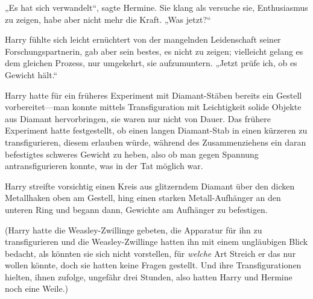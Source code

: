 „Es hat sich verwandelt“, sagte Hermine. Sie klang als versuche sie, Enthusiasmus zu zeigen, habe aber nicht mehr die Kraft. „Was jetzt?“

Harry fühlte sich leicht ernüchtert von der mangelnden Leidenschaft seiner Forschungspartnerin, gab aber sein bestes, es nicht zu zeigen; vielleicht gelang es dem gleichen Prozess, nur umgekehrt, sie aufzumuntern. „Jetzt prüfe ich, ob es Gewicht hält.“

Harry hatte für ein früheres Experiment mit Diamant-Stäben bereits ein Gestell vorbereitet—man konnte mittels Transfiguration mit Leichtigkeit solide Objekte aus Diamant hervorbringen, sie waren nur nicht von Dauer. Das frühere Experiment hatte festgestellt, ob einen langen Diamant-Stab in einen kürzeren zu transfigurieren, diesem erlauben würde, während des Zusammenziehens ein daran befestigtes schweres Gewicht zu heben, also ob man gegen Spannung antransfigurieren konnte, was in der Tat möglich war.

Harry streifte vorsichtig einen Kreis aus glitzerndem Diamant über den dicken Metallhaken oben am Gestell, hing einen starken Metall-Aufhänger an den unteren Ring und begann dann, Gewichte am Aufhänger zu befestigen.

(Harry hatte die Weasley-Zwillinge gebeten, die Apparatur für ihn zu transfigurieren und die Weasley-Zwillinge hatten ihn mit einem ungläubigen Blick bedacht, als könnten sie sich nicht vorstellen, für \emph{welche} Art Streich er das nur wollen könnte, doch sie hatten keine Fragen gestellt. Und ihre Transfigurationen hielten, ihnen zufolge, ungefähr drei Stunden, also hatten Harry und Hermine noch eine Weile.)

